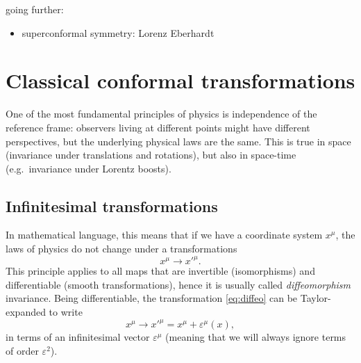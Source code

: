 \documentclass[a4paper,12pt]{article}
\numberwithin{equation}{section}
\begin{document}
going further:
\begin{itemize}

\item
superconformal symmetry: Lorenz Eberhardt 
\cite{Eberhardt:2020cxo}

\end{itemize}



\section{Classical conformal transformations}

One of the most fundamental principles of physics is independence of the reference frame: observers living at different points might have different perspectives, but the underlying physical laws are the same.
This is true in space (invariance under translations and rotations), but also in space-time (e.g.~invariance under Lorentz boosts).

\subsection{Infinitesimal transformations}

In mathematical language, this means that if we have a coordinate system $x^\mu$, the laws of physics do not change under a transformations 
\begin{equation}
	x^\mu \to x'^\mu.
	\label{eq:diffeo}
\end{equation}
This principle applies to all maps that are invertible (isomorphisms) and differentiable (smooth transformations), hence it is usually called \emph{diffeomorphism} invariance.
Being differentiable, the transformation \eqref{eq:diffeo} can be Taylor-expanded to write
\begin{equation}
	x^\mu \to x'^\mu = x^\mu + \varepsilon^\mu(x),
	\label{eq:diffeo:infinitesimal}
\end{equation}
in terms of an infinitesimal vector $\varepsilon^\mu$ (meaning that we will always ignore terms of order $\varepsilon^2$).
\end{document}
